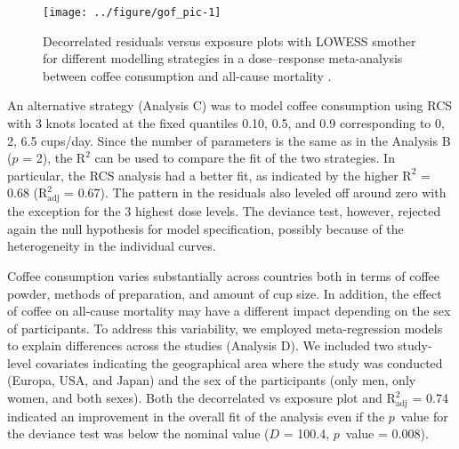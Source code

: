 \documentclass[11pt,a4paper,twoside,openany]{book}\usepackage{knitr}
\begin{document}
{{\begin{knitrout}\footnotesize
{}\color{fgcolor}\begin{figure}[ht!]

{\centering \texttt{[image: ../figure/gof\_pic-1]} 

}

\caption[Decorrelated residuals versus exposure plots with LOWESS smother for different modelling strategies in a dose--response meta-analysis between coffee consumption and all-cause mortality \citep{crippa2014coffee}]{Decorrelated residuals versus exposure plots with LOWESS smother for different modelling strategies in a dose--response meta-analysis between coffee consumption and all-cause mortality \citep{crippa2014coffee}.}\label{fig:gof_pic}
\end{figure}


\end{knitrout}

\noindent An alternative strategy (Analysis C) was to model coffee consumption using RCS with 3 knots located at the fixed quantiles 0.10, 0.5, and 0.9 corresponding to 0, 2, 6.5 cups/day. Since the number of parameters is the same as in the Analysis B ($p$ = 2), the \textrm{$\mathrm{R^2}$} can be used to compare the fit of the two strategies. In particular, the RCS analysis had a better fit, as indicated by the higher \textrm{$\mathrm{R^2}$} = 0.68 (\textrm{$\mathrm{R_{\textrm{adj}}^2}$} = 0.67). The pattern in the residuals also leveled off around zero with the exception for the 3 highest dose levels. The deviance test, however, rejected again the null hypothesis for model specification, possibly because of the heterogeneity in the individual curves. 

Coffee consumption varies substantially across countries both in terms of coffee powder, methods of preparation, and amount of cup size. In addition, the effect of coffee on all-cause mortality may have a different impact depending on the sex of participants. To address this variability, we employed meta-regression models to explain differences across the studies (Analysis D). We included two study-level covariates indicating the geographical area where the study was conducted (Europa, USA, and Japan) and the sex of the participants (only men, only women, and both sexes). Both the decorrelated vs exposure plot and \textrm{$\mathrm{R_{\textrm{adj}}^2}$} = 0.74 indicated an improvement in the overall fit of the analysis even if the $p$~value for the deviance test was below the nominal value ($D$ = 100.4, $p$~value = 0.008).

}}
\end{document}
